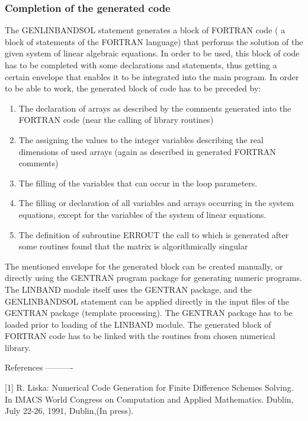 \subsubsection{Completion of the generated code}


     The GENLINBANDSOL statement generates a block  of FORTRAN  code ( a
block of  statements of the FORTRAN language) that performs the solution
of the given system of linear algebraic equations. In order  to be used,
this  block  of  code  has  to  be  completed with some declarations and
statements, thus getting  a  certain  envelope  that  enables  it  to be
integrated into the main program.
     In order  to be able to work, the generated block of code has to be
preceded by:
\begin{enumerate}
  \item The declaration  of arrays as  described by the  comments generated
  into the FORTRAN code (near the calling of library routines)

  \item The assigning  the values to  the integer variables  describing the
  real  dimensions  of  used  arrays  (again  as  described in generated
  FORTRAN comments)

  \item The filling of the variables that can occur in the loop parameters.

  \item The filling or declaration of all variables and arrays occurring in
  the system equations, except for the variables of the system of linear
  equations.

  \item The definition of subroutine ERROUT the call to which is  generated
  after some routines found that the matrix is algorithmically singular
\end{enumerate}
     The  mentioned  envelope  for  the  generated  block can be created
manually, or directly using  the GENTRAN program package  for generating
numeric programs. The  LINBAND module itself  uses the GENTRAN  package,
and the  GENLINBANDSOL statement  can be  applied directly  in the input
files of the GENTRAN package (template processing). The GENTRAN  package
has to be loaded prior to loading of the LINBAND module.
     The  generated  block  of  FORTRAN  code  has to be linked with the
routines from chosen numerical library.







References
----------

[1] R. Liska:  Numerical Code Generation  for Finite Difference  Schemes
     Solving.   In  IMACS  World  Congress  on  Computation  and Applied
     Mathematics. Dublin, July 22-26, 1991, Dublin,(In press).


